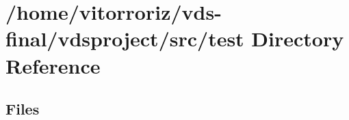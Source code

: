 \section{/home/vitorroriz/vds-\/final/vdsproject/src/test Directory Reference}
\label{dir_120ed4da3e3217b1e7fc0b4f48568e79}
\subsection*{Files}
\begin{DoxyCompactItemize}
\end{DoxyCompactItemize}
